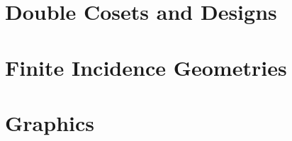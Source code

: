 \documentclass[10pt,a4paper]{book}
\begin{document}
{%


\chapter{Double Cosets and Designs}














%
%
%
%
%
%
%
%
%
%
%
%
%
%
%
%
%
%
%


\chapter{Finite Incidence Geometries}


\chapter{Graphics}







%


}%
\end{document}
